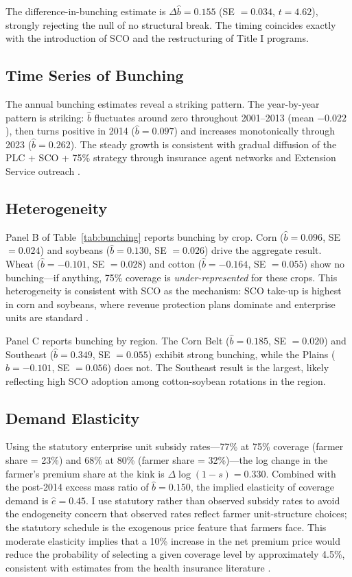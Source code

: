 \documentclass[12pt]{article}
\begin{document}
The difference-in-bunching estimate is $\Delta\hat{b} = 0.155$ (SE $= 0.034$, $t = 4.62$), strongly rejecting the null of no structural break. The timing coincides exactly with the introduction of SCO and the restructuring of Title I programs.

\subsection{Time Series of Bunching}

The annual bunching estimates reveal a striking pattern. The year-by-year pattern is striking: $\hat{b}$ fluctuates around zero throughout 2001--2013 (mean $-0.022$), then turns positive in 2014 ($\hat{b} = 0.097$) and increases monotonically through 2023 ($\hat{b} = 0.262$). The steady growth is consistent with gradual diffusion of the PLC + SCO + 75\% strategy through insurance agent networks and Extension Service outreach \citep{plastina2018}.

\subsection{Heterogeneity}

Panel B of Table~\ref{tab:bunching} reports bunching by crop. Corn ($\hat{b} = 0.096$, SE $= 0.024$) and soybeans ($\hat{b} = 0.130$, SE $= 0.026$) drive the aggregate result. Wheat ($\hat{b} = -0.101$, SE $= 0.028$) and cotton ($\hat{b} = -0.164$, SE $= 0.055$) show no bunching---if anything, 75\% coverage is \textit{under-represented} for these crops. This heterogeneity is consistent with SCO as the mechanism: SCO take-up is highest in corn and soybeans, where revenue protection plans dominate and enterprise units are standard \citep{shields2015}.

Panel C reports bunching by region. The Corn Belt ($\hat{b} = 0.185$, SE $= 0.020$) and Southeast ($\hat{b} = 0.349$, SE $= 0.055$) exhibit strong bunching, while the Plains ($\hat{b} = -0.101$, SE $= 0.056$) does not. The Southeast result is the largest, likely reflecting high SCO adoption among cotton-soybean rotations in the region.

\subsection{Demand Elasticity}

Using the statutory enterprise unit subsidy rates---77\% at 75\% coverage (farmer share = 23\%) and 68\% at 80\% (farmer share = 32\%)---the log change in the farmer's premium share at the kink is $\Delta\log(1-s) = 0.330$. Combined with the post-2014 excess mass ratio of $\hat{b} = 0.150$, the implied elasticity of coverage demand is $\hat{e} = 0.45$. I use statutory rather than observed subsidy rates to avoid the endogeneity concern that observed rates reflect farmer unit-structure choices; the statutory schedule is the exogenous price feature that farmers face. This moderate elasticity implies that a 10\% increase in the net premium price would reduce the probability of selecting a given coverage level by approximately 4.5\%, consistent with estimates from the health insurance literature \citep{einav2010}.
\end{document}
